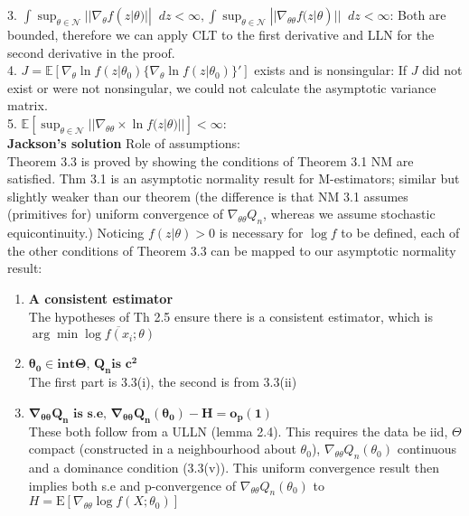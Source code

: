\documentclass[11pt,letterpaper]{article}                  %
\newcommand*\diff{\mathop{}\!d} %
\begin{document}
\begin{problem}
3. $\int \sup_{\theta \in \mathcal{N}} || \nabla_\theta f(z|\theta) || \diff z < \infty, \int \sup_{\theta \in \mathcal{N}} || \nabla_{\theta \theta} f(z|\theta) || \diff z < \infty$: Both are bounded, therefore we can apply CLT to the first derivative and LLN for the second derivative in the proof.\\

4. $J = \mathbb{E} [\nabla_\theta \ln f(z|\theta_0) \{\nabla_\theta \ln f(z|\theta_0)  \}' ]$ exists and is nonsingular: If $J$ did not exist or were not nonsingular, we could not calculate the asymptotic variance matrix.\\

5. $ \mathbb{E} [ \sup_{\theta \in \mathcal{N}} || \nabla_{\theta \theta}  \times \ln f(z|\theta)||] < \infty$: \\

\textbf{Jackson's solution}
Role of assumptions: \\

Theorem 3.3 is proved by showing the conditions of Theorem 3.1
NM are satisfied. Thm 3.1 is an asymptotic normality result for
M-estimators; similar but slightly weaker than our 
theorem (the difference is that NM 3.1 assumes (primitives for)
uniform convergence of $\nabla_{\theta\theta} Q_n$, whereas we assume
stochastic equicontinuity.) Noticing $f(z|\theta) > 0$ is necessary
for $\log f$ to be defined, each of the other conditions of Theorem 3.3
can be mapped to our asymptotic normality result:

\begin{enumerate}
\item \textbf{A consistent estimator} \\The hypotheses of Th 2.5
  ensure there is a consistent estimator, which is $\arg\min
  \overline{\log f(x_i; \theta)}$

\item $\mathbf{\theta_0 \in \textbf{int}\Theta\textbf{, }Q_n \textbf{
      is }c^2}$ \\
The first part is 3.3(i), the second is from 3.3(ii) 

\item $\mathbf{\nabla_{\theta\theta} Q_n \textbf{ is s.e, }
    \nabla_{\theta\theta} Q_n(\theta_0) - H = o_p(1)}$ \\
These both follow from a ULLN (lemma 2.4). This requires
the data be iid, $\Theta$ compact (constructed in a neighbourhood
about $\theta_0$), $\nabla_{\theta\theta}
Q_n(\theta_0)$ continuous and a dominance condition (3.3(v)). This
uniform convergence result then implies both s.e and p-convergence of $\nabla_{\theta\theta} Q_n(\theta_0)$ to $H =
\mathrm{E}[\nabla_{\theta\theta} \log f(X;\theta_0)]$


\end{enumerate}
\end{problem}
\end{document}
